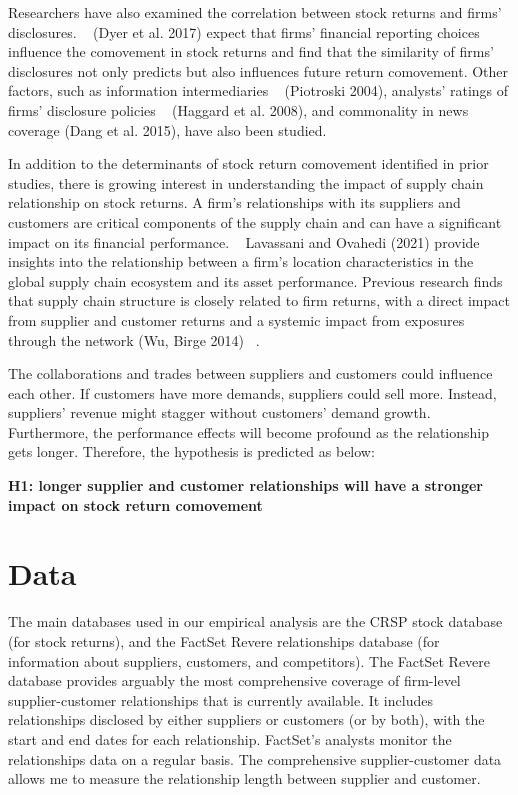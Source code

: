 \documentclass[12pt,english]{article}
\begin{document}
Researchers have also examined the correlation between stock returns and firms' disclosures. ~\citep{dyer2017evolution} (Dyer et al. 2017) expect that firms' financial reporting choices influence the comovement in stock returns and find that the similarity of firms' disclosures not only predicts but also influences future return comovement. Other factors, such as information intermediaries ~\citep{piotroski2004influence} (Piotroski 2004), analysts' ratings of firms' disclosure policies ~\citep{haggard2008does} (Haggard et al. 2008), and commonality in news coverage \citep{dang2015commonality} (Dang et al. 2015), have also been studied.

In addition to the determinants of stock return comovement identified in prior studies, there is growing interest in understanding the impact of supply chain relationship on stock returns. A firm's relationships with its suppliers and customers are critical components of the supply chain and can have a significant impact on its financial performance. ~\citep{lavassani2021firm} Lavassani and Ovahedi (2021) provide insights into the relationship between a firm's location characteristics in the global supply chain ecosystem and its asset performance.  Previous research finds that supply chain structure is closely related to firm returns, with a direct impact from supplier and customer returns and a systemic impact from exposures through the network (Wu, Birge 2014) ~\citep{wu2014supply}.

The collaborations and trades between suppliers and customers could influence each other. If customers have more demands, suppliers could sell more. Instead, suppliers' revenue might stagger without customers' demand growth. Furthermore, the performance effects will become profound as the relationship gets longer. Therefore, the hypothesis is predicted as below:


\textbf{H1: longer supplier and customer relationships will have a stronger impact on stock return 
    comovement}
    

\section{Data}\label{sec:data}
The main databases used in our empirical analysis are the CRSP stock database
(for stock returns), and the FactSet Revere relationships database (for information about
suppliers, customers, and competitors).
The FactSet Revere database provides arguably the most comprehensive
coverage of firm-level supplier-customer relationships that is currently
available. It includes relationships disclosed by either suppliers or customers
(or by both), with the start and end dates for each relationship. FactSet’s analysts
monitor the relationships data on a regular basis. The comprehensive supplier-customer data allows me to measure the relationship length between supplier and customer. 
\end{document}
